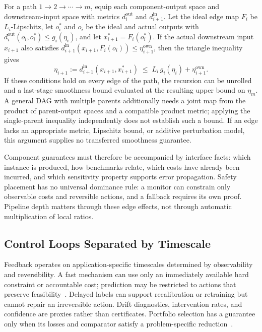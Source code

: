 \documentclass[acmsmall,screen,nonacm]{acmart}
\theoremstyle{acmdefinition}%
\begin{document}
\begin{proposition}
\label{prop:errprop}
For a path $1\to2\to\cdots\to m$, equip each component-output space and downstream-input space with metrics $d_i^{\mathrm{out}}$ and $d_{i+1}^{\mathrm{in}}$. Let the ideal edge map $F_i$ be $L_i$-Lipschitz, let $o_i^*$ and $o_i$ be the ideal and actual outputs with $d_i^{\mathrm{out}}(o_i,o_i^*)\leq g_i(\eta_i)$, and let $x_{i+1}^*=F_i(o_i^*)$. If the actual downstream input $x_{i+1}$ also satisfies $d_{i+1}^{\mathrm{in}}(x_{i+1},F_i(o_i))\leq \eta_{i+1}^{\mathrm{own}}$, then the triangle inequality gives
\begin{equation}
    \eta_{i+1}:=d_{i+1}^{\mathrm{in}}(x_{i+1},x_{i+1}^*)
    \;\leq\; L_i\, g_i(\eta_i) + \eta_{i+1}^{\mathrm{own}}.
    \label{eq_errprop}
\end{equation}
If these conditions hold on every edge of the path, the recursion can be unrolled and a last-stage smoothness bound evaluated at the resulting upper bound on $\eta_m$. A general DAG with multiple parents additionally needs a joint map from the product of parent-output spaces and a compatible product metric; applying the single-parent inequality independently does not establish such a bound. If an edge lacks an appropriate metric, Lipschitz bound, or additive perturbation model, this argument supplies no transferred smoothness guarantee.
\end{proposition}


Component guarantees must therefore be accompanied by interface facts: which instance is produced, how benchmarks relate, which costs have already been incurred, and which sensitivity property supports error propagation. Safety placement has no universal dominance rule: a monitor can constrain only observable costs and reversible actions, and a fallback requires its own proof. Pipeline depth matters through these edge effects, not through automatic multiplication of local ratios.

\subsection{Control Loops Separated by Timescale}
\label{subsec:loops}

Feedback operates on application-specific timescales determined by observability and reversibility. A fast mechanism can use only an immediately available hard constraint or accountable cost; prediction may be restricted to actions that preserve feasibility~\cite{agrawal2023safety}. Delayed labels can support recalibration or retraining but cannot repair an irreversible action. Drift diagnostics, intervention rates, and confidence are proxies rather than certificates. Portfolio selection has a guarantee only when its losses and comparator satisfy a problem-specific reduction~\cite{dinitz2022portfolios}.
\end{document}
